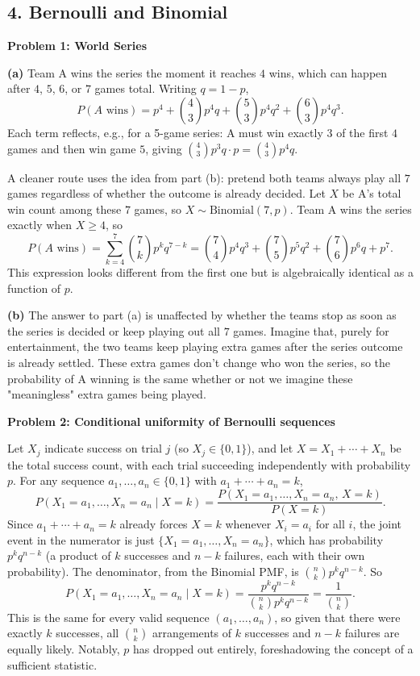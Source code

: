 \documentclass{article}
\begin{document}
\subsection*{4. Bernoulli and Binomial}

\textbf{Problem 1: World Series}

\textbf{(a)} Team A wins the series the moment it reaches $4$ wins, which can happen after $4$, $5$, $6$, or $7$ games total. Writing $q=1-p$,
$$
P(A\text{ wins}) = p^4 + \binom{4}{3}p^4 q + \binom{5}{3}p^4q^2 + \binom{6}{3}p^4q^3.
$$
Each term reflects, e.g., for a 5-game series: A must win exactly $3$ of the first $4$ games and then win game $5$, giving $\binom{4}{3}p^3q\cdot p = \binom{4}{3}p^4q$.

A cleaner route uses the idea from part (b): pretend both teams always play all $7$ games regardless of whether the outcome is already decided. Let $X$ be A's total win count among these $7$ games, so $X\sim\text{Binomial}(7,p)$. Team A wins the series exactly when $X\ge 4$, so
$$
P(A\text{ wins}) = \sum_{k=4}^{7}\binom{7}{k}p^k q^{7-k} = \binom{7}{4}p^4q^3+\binom{7}{5}p^5q^2+\binom{7}{6}p^6q+p^7.
$$
This expression looks different from the first one but is algebraically identical as a function of $p$.

\medskip
\textbf{(b)} The answer to part (a) is unaffected by whether the teams stop as soon as the series is decided or keep playing out all $7$ games. Imagine that, purely for entertainment, the two teams keep playing extra games after the series outcome is already settled. These extra games don't change who won the series, so the probability of A winning is the same whether or not we imagine these "meaningless" extra games being played.

\bigskip
\textbf{Problem 2: Conditional uniformity of Bernoulli sequences}

Let $X_j$ indicate success on trial $j$ (so $X_j\in\{0,1\}$), and let $X=X_1+\cdots+X_n$ be the total success count, with each trial succeeding independently with probability $p$. For any sequence $a_1,\dots,a_n\in\{0,1\}$ with $a_1+\cdots+a_n=k$,
$$
P(X_1=a_1,\dots,X_n=a_n\mid X=k) = \frac{P(X_1=a_1,\dots,X_n=a_n,\,X=k)}{P(X=k)}.
$$
Since $a_1+\cdots+a_n=k$ already forces $X=k$ whenever $X_i=a_i$ for all $i$, the joint event in the numerator is just $\{X_1=a_1,\dots,X_n=a_n\}$, which has probability $p^kq^{n-k}$ (a product of $k$ successes and $n-k$ failures, each with their own probability). The denominator, from the Binomial PMF, is $\binom{n}{k}p^kq^{n-k}$. So
$$
P(X_1=a_1,\dots,X_n=a_n\mid X=k) = \frac{p^kq^{n-k}}{\binom{n}{k}p^kq^{n-k}} = \frac{1}{\binom{n}{k}}.
$$
This is the same for every valid sequence $(a_1,\dots,a_n)$, so given that there were exactly $k$ successes, all $\binom{n}{k}$ arrangements of $k$ successes and $n-k$ failures are equally likely. Notably, $p$ has dropped out entirely, foreshadowing the concept of a sufficient statistic.
\end{document}
